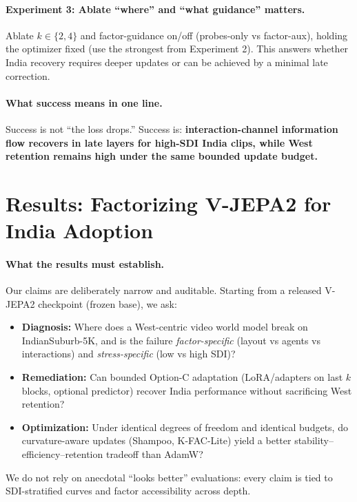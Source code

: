\paragraph{Experiment 3: Ablate ``where'' and ``what guidance'' matters.}
Ablate $k\in\{2,4\}$ and factor-guidance on/off (probes-only vs factor-aux), holding the optimizer fixed (use the strongest from Experiment 2). This answers whether India recovery requires deeper updates or can be achieved by a minimal late correction.

\paragraph{What success means in one line.}
Success is not ``the loss drops.'' Success is: \textbf{interaction-channel information flow recovers in late layers for high-SDI India clips, while West retention remains high under the same bounded update budget.}





















\section{Results: Factorizing V-JEPA2 for India Adoption}
\label{sec:results_india_factorize}

\vspace{2pt}
\paragraph{What the results must establish.}
Our claims are deliberately narrow and auditable. Starting from a released V-JEPA2 checkpoint (frozen base), we ask:
\begin{itemize}[leftmargin=*,itemsep=2pt]
\item \textbf{Diagnosis:} Where does a West-centric video world model break on IndianSuburb-5K, and is the failure \emph{factor-specific} (layout vs agents vs interactions) and \emph{stress-specific} (low vs high SDI)?
\item \textbf{Remediation:} Can bounded Option-C adaptation (LoRA/adapters on last $k$ blocks, optional predictor) recover India performance without sacrificing West retention?
\item \textbf{Optimization:} Under identical degrees of freedom and identical budgets, do curvature-aware updates (Shampoo, K-FAC-Lite) yield a better stability--efficiency--retention tradeoff than AdamW?
\end{itemize}
We do not rely on anecdotal ``looks better'' evaluations: every claim is tied to SDI-stratified curves and factor accessibility across depth.

